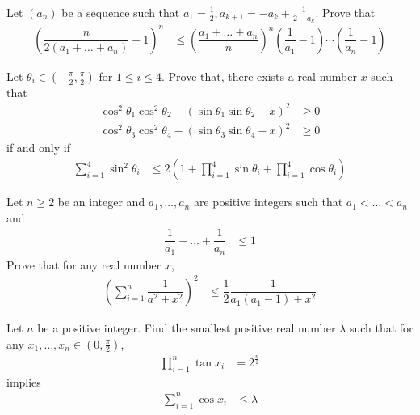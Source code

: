 \documentclass{subfile}
\begin{document}
		\begin{problem}[$2006$, problem $5$]
			Let $(a_{n})$ be a sequence such that $a_{1}=\frac{1}{2},a_{k+1}=-a_{k}+\frac{1}{2-a_{k}}$. Prove that
				\begin{align*}
					\left(\dfrac{n}{2(a_{1}+\ldots+a_{n})}-1\right)^{n}
						& \leq\left(\dfrac{a_{1}+\ldots+a_{n}}{n}\right)^{n}\left(\dfrac{1}{a_{1}}-1\right)\cdots\left(\dfrac{1}{a_{n}}-1\right)
				\end{align*}
		\end{problem}
	
		\begin{problem}[$2005$, problem $1$]
			Let $\theta_{i}\in\left(-\frac{\pi}{2},\frac{\pi}{2}\right)$ for $1\leq i\leq 4$. Prove that, there exists a real number $x$ such that
				\begin{align*}
					\cos^{2}{\theta_{1}}\cos^{2}{\theta_{2}}-(\sin{\theta_{1}}\sin{\theta_{2}}-x)^{2}
						& \geq0\\
					\cos^{2}{\theta_{3}}\cos^{2}{\theta_{4}}-(\sin{\theta_{3}}\sin{\theta_{4}}-x)^{2}
						& \geq0
				\end{align*}
			if and only if
				\begin{align*}
					\sum_{i=1}^{4}\sin^{2}{\theta_{i}}
						& \leq 2\left(1+\prod_{i=1}^{4}\sin{\theta_{i}}+\prod_{i=1}^{4}\cos{\theta_{i}}\right)
				\end{align*}
		\end{problem}
	
		\begin{problem}[$2004$, problem $2$]
			Let $n\geq2$ be an integer and $a_{1},\ldots,a_{n}$ are positive integers such that $a_{1}<\ldots<a_{n}$ and
				\begin{align*}
					\dfrac{1}{a_{1}}+\ldots+\dfrac{1}{a_{n}}
						& \leq1
				\end{align*}
			Prove that for any real number $x$,
				\begin{align*}
					\left(\sum_{i=1}^{n}\dfrac{1}{a^{2}+x^{2}}\right)^{2}
						& \leq \dfrac{1}{2}\dfrac{1}{a_{1}(a_{1}-1)+x^{2}}
				\end{align*}
		\end{problem}
	
		\begin{problem}[$2003$, problem $3$]
			Let $n$ be a positive integer. Find the smallest positive real number $\lambda$ such that for any $x_{1},\ldots,x_{n}\in\left(0,\frac{\pi}{2}\right)$,
				\begin{align*}
					\prod_{i=1}^{n}\tan{x_{i}}
						& = 2^{\frac{n}{2}}
				\end{align*}
			implies
				\begin{align*}
					\sum_{i=1}^{n}\cos{x_{i}}
						& \leq \lambda
				\end{align*}
		\end{problem}
	
\end{document}
